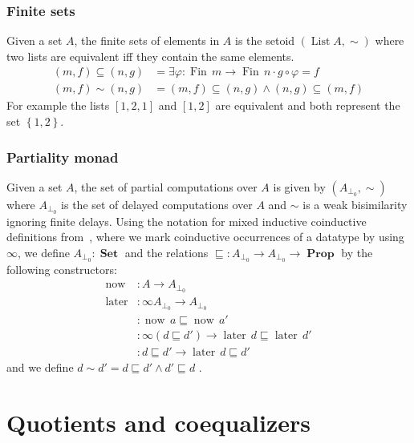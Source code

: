 \documentclass[envcountsame]{llncs}
\providecommand{\set}  [1]{\left\{#1\right\}}
\DeclareMathOperator{\Prop}{\mathbf{Prop}}
\DeclareMathOperator{\Set}{\mathbf{Set}}
\DeclareMathOperator{\List}{List}
\DeclareMathOperator{\Fin}{Fin}
\DeclareMathOperator{\now}{now}
\DeclareMathOperator{\later}{later}
\DeclareMathOperator{\nowequal}{now_\sqsubseteq}
\DeclareMathOperator{\laterequal}{later_\sqsubseteq}
\DeclareMathOperator{\laterleft}{later_{left}}
\begin{document}
\subsubsection*{Finite sets}
Given a set $A$, the finite sets of elements in $A$ is the setoid $(\List A,{\sim})$ where two lists are equivalent if{f} they contain the same elements.
\begin{align*}
(m,f)\subseteq(n,g) &= \exists \varphi : \Fin\,m \to \Fin\,n \cdot  g\circ\varphi = f  \\
(m,f)\sim(n,g)&= (m,f)\subseteq(n,g) \wedge (n,g)\subseteq(m,f)
\end{align*}
For example the lists $[1,2,1]$ and $[1,2]$ are equivalent and both represent the set $\set{1,2}$.
\subsubsection*{Partiality monad}
Given a set $A$, the set of partial computations over $A$ is given by $(A_{\bot_0},{\sim})$ where $A_{\bot_0}$ is the set of delayed computations over $A$  and $\sim$ is a weak bisimilarity ignoring finite delays. Using the notation for mixed inductive coinductive  definitions from~\cite{danielsson2010mpc}, where we mark coinductive occurrences of a datatype by using $\infty$, we define $A_{\bot_0} : \Set$ and the relations $\sqsubseteq:A_{\bot_0}\to A_{\bot_0} \to \Prop$ by the following constructors:
\begin{align*}
\now  &: A \to A_{\bot_0}\\
\later &: \infty A_{\bot_0} \to  A_{\bot_0}\\
\nowequal &: \now\, a \sqsubseteq \now\,a'\\
\laterequal &: \infty(d \sqsubseteq d') \to \later\,d \sqsubseteq \later\,d'\\
\laterleft &: d\sqsubseteq d' \to \later\,d \sqsubseteq d'
\end{align*}
and we define $d\sim d'= d\sqsubseteq d' \wedge d'\sqsubseteq d$ .

\section{Quotients and coequalizers}\label{sec:quotients}
\end{document}
